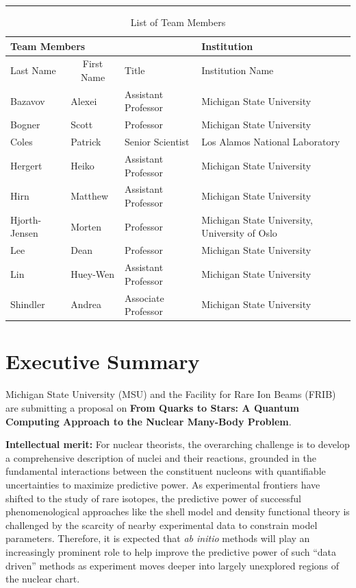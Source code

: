 \documentclass[10pt]{article}
\begin{document}
\rule{\linewidth}{1mm}
\begin{table}[hbtp]
\caption{List of Team Members}
\begin{center}
\begin{tabular}{|l|l|l|l|}
\hline
\multicolumn{3}{|l}{{\bf Team Members} } & \multicolumn{1}{|l|}{{\bf Institution}}\\
\hline
\multicolumn{1}{|l}{Last Name} & \multicolumn{1}{|c|}{First Name} & \multicolumn{1}{l|}{Title} & \multicolumn{1}{l|}{Institution Name} \\
\hline
Bazavov & Alexei & Assistant Professor & Michigan State University \\
\hline
Bogner & Scott & Professor & Michigan State University \\
\hline
Coles & Patrick & Senior Scientist & Los Alamos National Laboratory \\
\hline
Hergert & Heiko & Assistant Professor & Michigan State University \\
\hline
Hirn & Matthew & Assistant Professor & Michigan State University \\
\hline
Hjorth-Jensen & Morten & Professor & Michigan State University, University of Oslo\\
\hline
Lee & Dean & Professor & Michigan State University \\
\hline
Lin & Huey-Wen & Assistant Professor & Michigan State University \\
\hline
Shindler & Andrea & Associate Professor & Michigan State University \\
\hline

\end{tabular}
\end{center}
\end{table}

\newpage
\tableofcontents
\section{Executive Summary}

Michigan State University (MSU) and the Facility for Rare Ion Beams (FRIB) are submitting 
a proposal on {\bf From Quarks to Stars: A Quantum Computing Approach to the Nuclear Many-Body Problem}. 

{\bf Intellectual merit:} For nuclear theorists, the overarching
challenge is to develop a comprehensive description of nuclei and
their reactions, grounded in the fundamental interactions between the
constituent nucleons with quantifiable uncertainties to maximize
predictive power.  As experimental frontiers have shifted to the study
of rare isotopes, the predictive power of successful phenomenological
approaches like the shell model and density functional theory is
challenged by the scarcity of nearby experimental data to constrain
model parameters. Therefore, it is expected that \emph{ab initio}
methods will play an increasingly prominent role to help improve the
predictive power of such ``data driven'' methods as experiment moves
deeper into largely unexplored regions of the nuclear chart.
\end{document}
